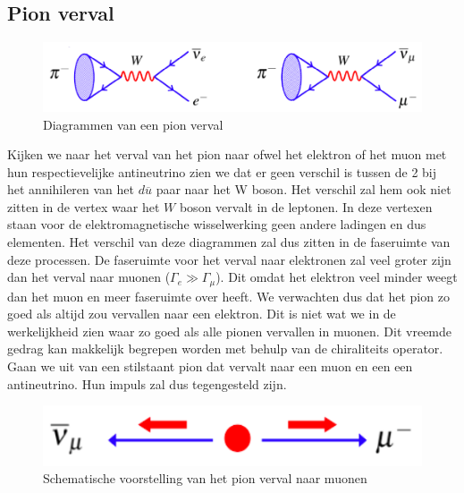 \documentclass[../main.tex]{subfiles}
\begin{document}
\subsection{Pion verval}%
\label{sub:pion_verval}

\begin{figure}[h]
    \centering
    \includegraphics[width=0.8\linewidth]{parity_violation/pion_verval.png}
    \caption{Diagrammen van een pion verval}%
    \label{fig:parity_violation/pion_verval}
\end{figure}

Kijken we naar het verval van het pion naar ofwel het elektron of het muon met hun respectievelijke antineutrino zien we dat er geen verschil is tussen de 2 bij het annihileren van het $d\overline u$ paar naar het W boson. Het verschil zal hem ook niet zitten in de vertex waar het $W$ boson vervalt in de leptonen. In deze vertexen staan voor de elektromagnetische wisselwerking geen andere ladingen en dus elementen. Het verschil van deze diagrammen zal dus zitten in de faseruimte van deze processen. De faseruimte voor het verval naar elektronen zal veel groter zijn dan het verval naar muonen ($\Gamma_e \gg \Gamma_\mu$). Dit omdat het elektron veel minder weegt dan het muon en meer faseruimte over heeft. We verwachten dus dat het pion zo goed als altijd zou vervallen naar een elektron. Dit is niet wat we in de werkelijkheid zien waar zo goed als alle pionen vervallen in muonen. Dit vreemde gedrag kan makkelijk begrepen worden met behulp van de chiraliteits operator.\\
Gaan we uit van een stilstaant pion dat vervalt naar een muon en een een antineutrino. Hun impuls zal dus tegengesteld zijn.

\begin{figure}[h]
    \centering
    \includegraphics[width=0.8\linewidth]{parity_violation/pion_verval_kin.png}
    \caption{Schematische voorstelling van het pion verval naar muonen}%
    \label{fig:parity_violation/pion_verval_kin}
\end{figure}
\end{document}

